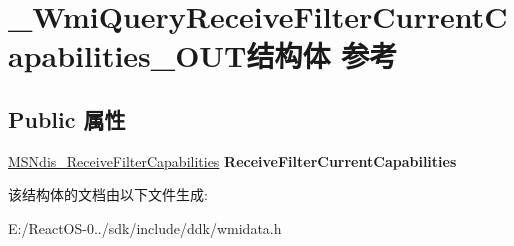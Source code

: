 \hypertarget{struct___wmi_query_receive_filter_current_capabilities___o_u_t}{}\section{\+\_\+\+Wmi\+Query\+Receive\+Filter\+Current\+Capabilities\+\_\+\+O\+U\+T结构体 参考}
\label{struct___wmi_query_receive_filter_current_capabilities___o_u_t}
\subsection*{Public 属性}
\begin{DoxyCompactItemize}
\item 
\mbox{\label{struct___wmi_query_receive_filter_current_capabilities___o_u_t_a2145524da47c97b85ca3ae455b3e889f}} 
\hyperlink{struct___m_s_ndis___receive_filter_capabilities}{M\+S\+Ndis\+\_\+\+Receive\+Filter\+Capabilities} {\bfseries Receive\+Filter\+Current\+Capabilities}
\end{DoxyCompactItemize}


该结构体的文档由以下文件生成\+:\begin{DoxyCompactItemize}
\item 
E\+:/\+React\+O\+S-\/0../sdk/include/ddk/wmidata.\+h\end{DoxyCompactItemize}
